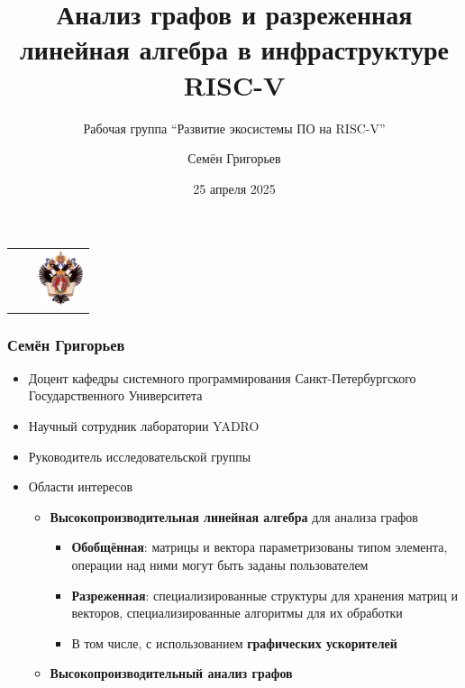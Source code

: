 \documentclass[xcolor=table,aspectratio=169]{beamer}
\title[Графы и линейная алгебра на RISC-V]{Анализ графов и разреженная линейная алгебра в инфраструктуре RISC-V}
\subtitle{Рабочая группа ``Развитие экосистемы ПО на RISC-V''}
\institute[СПбГУ]{
Санкт-Петербургский Государственный Университет
}
\author[Семён Григорьев]{Семён Григорьев}
\date{25 апреля 2025}
\begin{document}
{
\begin{frame}[fragile]
  \begin{table}
  \centering
  \begin{tabularx}{\linewidth}{XcX}
    \hfill
    & 
    & \hfill \includegraphics[height=1.6cm]{pictures/SPbGU_Logo.png}
  \end{tabularx}
  \end{table}
  \titlepage
\end{frame}
}

\begin{frame}[fragile]
  \frametitle{Семён Григорьев}
  \begin{minipage}{0.70\textwidth}
  \begin{itemize}    
    \item Доцент кафедры системного программирования Санкт-Петербургского Государственного Университета
    \item Научный сотрудник лаборатории YADRO
    \item Руководитель исследовательской группы
    \item Области интересов
    \begin{itemize}
      \item \textbf{Высокопроизводительная линейная алгебра} для анализа графов
      \begin{itemize}
        \item \textbf{Обобщённая}: матрицы и вектора параметризованы типом элемента, операции над ними могут быть заданы пользователем
        \item \textbf{Разреженная}: специализированные структуры для хранения матриц и векторов, специализированные алгоритмы для их обработки 
        \item В том числе, с использованием \textbf{графических ускорителей}
      \end{itemize}
      \item \textbf{Высокопроизводительный анализ графов}      
    \end{itemize}
    \end{itemize}
\end{minipage}
\begin{minipage}[t]{0.29\textwidth}
  \begin{center}

\end{center}
\end{minipage}
\end{frame}
\end{document}
